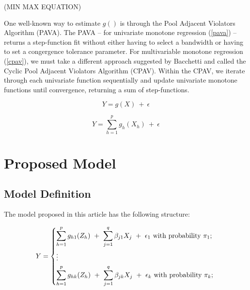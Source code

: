 \documentclass[fleqn,10pt]{olplainarticle}\usepackage[]{graphicx}\usepackage[]{color}
\begin{document}
(MIN MAX EQUATION)


One well-known way to estimate $g()$ is through the Pool Adjacent Violators Algorithm (PAVA). The PAVA -- for univariate monotone regression (\ref{pava}) -- returns a step-function fit without either having to select a bandwidth or having to set a congergence tolerance parameter. For multivariable monotone regression (\ref{cpav}), we must take a different approach suggested by Bacchetti and called the Cyclic Pool Adjacent Violators Algorithm (CPAV). Within the CPAV, we iterate through each univariate function sequentially and update univariate monotone functions until convergence, returning a sum of step-functions.



\begin{equation} \label{pava}
  Y = g(X) \ +\ \epsilon
\end{equation}


\begin{equation} \label{cpav}
  Y = \sum_{h=1}^{p} g_{h} (X_{h}) \ +\ \epsilon
\end{equation}


% 

\section{Proposed Model}


\subsection{Model Definition}

The model proposed in this article has the following structure:

\begin{equation} \label{modstruc}
  Y = 
  \begin{dcases}
    \sum_{h=1}^{p} g_{h1} (Z_{h}) \ +\  \sum_{j=1}^{q} \beta_{j1} X_{j} \ +\ \epsilon_1 \text{  with probability $\pi_1$; } \\
    \vdots \\
    \sum_{h=1}^{p} g_{hk} (Z_{h}) \ +\  \sum_{j=1}^{q} \beta_{jk} X_{j} \ +\ \epsilon_k \text{  with probability $\pi_k$; }\\
  \end{dcases}
\end{equation}
\end{document}
